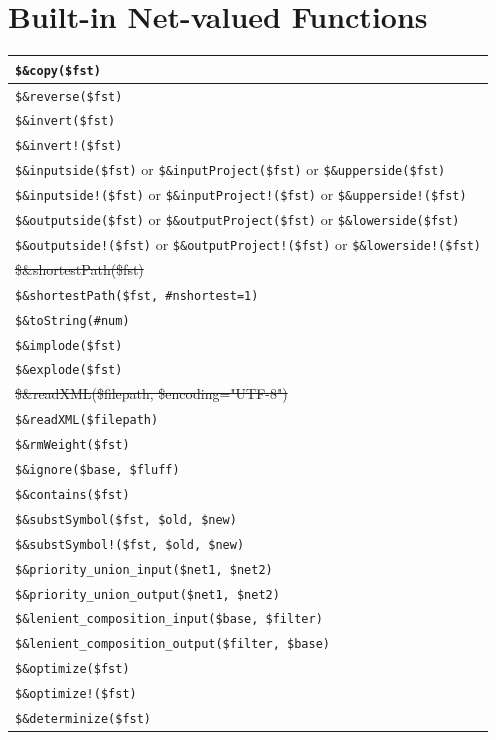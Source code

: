 \documentclass[letterpaper,12pt]{article}
\begin{document}
\newpage

\section{Built-in Net-valued Functions}

\begin{tabular}{|l|}
\hline
\verb!$&copy($fst)! \\
\hline
\verb!$&reverse($fst)! \\
\verb!$&invert($fst)!  \\
\verb+$&invert!($fst)+  \\
\verb!$&inputside($fst)!  or \verb!$&inputProject($fst)!  or \verb!$&upperside($fst)! \\
\verb+$&inputside!($fst)+  or \verb+$&inputProject!($fst)+  or \verb+$&upperside!($fst)+ \\
\verb!$&outputside($fst)! or \verb!$&outputProject($fst)! or \verb!$&lowerside($fst)! \\
\verb+$&outputside!($fst)+ or \verb+$&outputProject!($fst)+ or \verb+$&lowerside!($fst)+ \\
\sout{\$\&shortestPath(\$fst)} \\
\verb!$&shortestPath($fst, #nshortest=1)!\\
\hline
\verb!$&toString(#num)! \\
\verb!$&implode($fst)! \\
\verb!$&explode($fst)! \\
\hline
\sout{\$\&readXML(\$filepath, \$encoding="UTF-8")} \\
\verb!$&readXML($filepath)! \\
\hline
\verb!$&rmWeight($fst)!\\
\hline
\verb!$&ignore($base, $fluff)! \\
\verb!$&contains($fst)! \\
\hline
\verb!$&substSymbol($fst, $old, $new)!\\
\verb/$&substSymbol!($fst, $old, $new)/\\
\hline
\verb!$&priority_union_input($net1, $net2)! \\
\verb!$&priority_union_output($net1, $net2)! \\
\verb!$&lenient_composition_input($base, $filter)! \\
\verb!$&lenient_composition_output($filter, $base)! \\
\hline
\verb!$&optimize($fst)! \\
\verb/$&optimize!($fst)/ \\
\verb!$&determinize($fst)! \\

\end{tabular}
\end{document}
